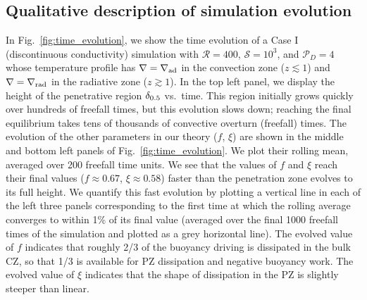 \documentclass[twocolumn]{aastex631}
\newcommand{\gradrad}{\ensuremath{\nabla_{\rm{rad}}}}
\newcommand{\gradad}{\ensuremath{\nabla_{\rm{ad}}}}
\newcommand{\justgrad}{\ensuremath{\nabla}}
\newcommand{\mP}{\ensuremath{\mathcal{P}}}
\newcommand{\mR}{\ensuremath{\mathcal{R}}}
\newcommand{\mS}{\ensuremath{\mathcal{S}}}
\begin{document}
\subsection{Qualitative description of simulation evolution}



In Fig.~\ref{fig:time_evolution}, we show the time evolution of a Case I (discontinuous conductivity) simulation with $\mR = 400$, $\mS = 10^3$, and $\mP_D = 4$ whose temperature profile has $\justgrad = \gradad$ in the convection zone ($z \lesssim 1$) and $\justgrad = \gradrad$ in the radiative zone ($z \gtrsim 1$).
In the top left panel, we display the height of the penetrative region $\delta_{\rm{0.5}}$ vs.~time.
This region initially grows quickly over hundreds of freefall times, but this evolution slows down; reaching the final equilibrium takes tens of thousands of convective overturn (freefall) times.
The evolution of the other parameters in our theory ($f$, $\xi$) are shown in the middle and bottom left panels of Fig.~\ref{fig:time_evolution}.
We plot their rolling mean, averaged over 200 freefall time units. 
We see that the values of $f$ and $\xi$ reach their final values ($f \approx 0.67$, $\xi \approx 0.58$) faster than the penetration zone evolves to its full height.
We quantify this fast evolution by plotting a vertical line in each of the left three panels corresponding to the first time at which the rolling average converges to within 1\% of its final value (averaged over the final 1000 freefall times of the simulation and plotted as a grey horizontal line).
The evolved value of $f$ indicates that roughly 2/3 of the buoyancy driving is dissipated in the bulk CZ, so that 1/3 is available for PZ dissipation and negative buoyancy work.
The evolved value of $\xi$ indicates that the shape of dissipation in the PZ is slightly steeper than linear.
\end{document}
